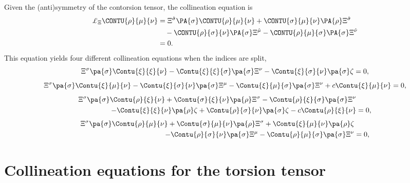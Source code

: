 \documentclass[aps,prd,12pt,superscriptaddress,showpacs,showkeys,reprint]{revtex4-1}
\begin{document}
Given the (anti)symmetry of the contorsion tensor, the collineation equation is
\begin{equation}
  \begin{split}
    \pounds_\Xi \CONTU{\rho}{\mu}{\nu} &= \Xi^{\hat{\sigma}} \PA{\sigma} \CONTU{\rho}{\mu}{\nu} + \CONTU{\sigma }{\mu}{\nu} \PA{\rho} \Xi^{\hat{\sigma}} \\
    & \quad - \CONTU{\rho }{\sigma}{\nu} \PA{\sigma} \Xi^{\hat{\mu}} - \CONTU{\rho}{\mu}{\sigma} \PA{\sigma} \Xi^{\hat{\nu}} \\
    &= 0.
  \end{split}
\end{equation}
This equation yields four different collineation equations when the indices are split,
\begin{equation}
    \Xi^\sigma \pa{\sigma} \Contu{\xi}{\xi}{\nu} - \Contu{\xi}{\xi}{\sigma} \pa{\sigma} \Xi^\nu - \Contu{\xi}{\sigma}{\nu} \pa{\sigma} \zeta = 0,
\end{equation}
\begin{equation}
  \Xi^\sigma \pa{\sigma} \Contu{\xi}{\mu}{\nu} - \Contu{\xi}{\sigma}{\nu} \pa{\sigma} \Xi^\mu - \Contu{\xi}{\mu}{\sigma} \pa{\sigma} \Xi^\nu + c \Contu{\xi}{\mu}{\nu} = 0,
\end{equation}
\begin{equation}
  \begin{split}
    \Xi^\sigma \pa{\sigma} \Contu{\rho}{\xi}{\nu} + \Contu{\sigma}{\xi}{\nu} \pa{\rho} \Xi^\sigma - \Contu{\rho}{\xi}{\sigma} \pa{\sigma} \Xi^\nu & \\
    - \Contu{\xi}{\xi}{\nu} \pa{\rho} \zeta + \Contu{\rho}{\sigma}{\nu} \pa{\sigma} \zeta - c \Contu{\rho}{\xi}{\nu} &= 0,
  \end{split}
\end{equation}
\begin{equation}
  \begin{split}
    \Xi^\sigma \pa{\sigma} \Contu{\rho}{\mu}{\nu} + \Contu{\sigma}{\mu}{\nu} \pa{\rho} \Xi^\sigma + \Contu{\xi}{\mu}{\nu} \pa{\rho} \zeta & \\
    - \Contu{\rho}{\sigma}{\nu} \pa{\sigma} \Xi^\mu - \Contu{\rho}{\mu}{\sigma} \pa{\sigma} \Xi^\nu &= 0,
  \end{split}  
\end{equation}

\section{Collineation equations for the torsion tensor}
\end{document}
